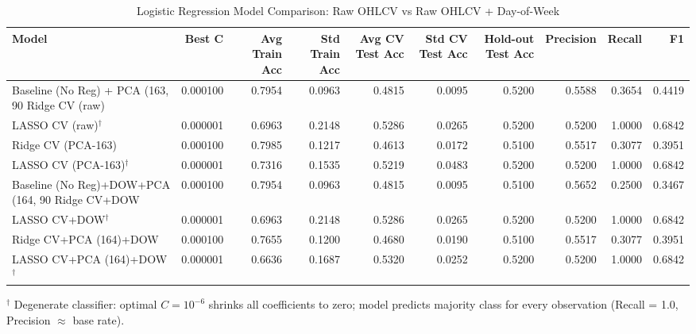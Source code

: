 \begin{table}[htbp]
\centering
\caption{Logistic Regression Model Comparison: Raw OHLCV vs Raw OHLCV + Day-of-Week}
\label{tab:base_logistic_comparison}
\begin{tabular}{lrrrrrrrrr}
\toprule
Model & Best C & Avg Train Acc & Std Train Acc & Avg CV Test Acc & Std CV Test Acc & Hold-out Test Acc & Precision & Recall & F1 \\
\midrule
Baseline (No Reg) + PCA (163, 90%
Ridge CV (raw) & 0.000100 & 0.7954 & 0.0963 & 0.4815 & 0.0095 & 0.5200 & 0.5588 & 0.3654 & 0.4419 \\
LASSO CV (raw)$^\dagger$ & 0.000001 & 0.6963 & 0.2148 & 0.5286 & 0.0265 & 0.5200 & 0.5200 & 1.0000 & 0.6842 \\
Ridge CV (PCA-163) & 0.000100 & 0.7985 & 0.1217 & 0.4613 & 0.0172 & 0.5100 & 0.5517 & 0.3077 & 0.3951 \\
LASSO CV (PCA-163)$^\dagger$ & 0.000001 & 0.7316 & 0.1535 & 0.5219 & 0.0483 & 0.5200 & 0.5200 & 1.0000 & 0.6842 \\
\midrule
Baseline (No Reg)+DOW+PCA (164, 90%
Ridge CV+DOW & 0.000100 & 0.7954 & 0.0963 & 0.4815 & 0.0095 & 0.5100 & 0.5652 & 0.2500 & 0.3467 \\
LASSO CV+DOW$^\dagger$ & 0.000001 & 0.6963 & 0.2148 & 0.5286 & 0.0265 & 0.5200 & 0.5200 & 1.0000 & 0.6842 \\
Ridge CV+PCA (164)+DOW & 0.000100 & 0.7655 & 0.1200 & 0.4680 & 0.0190 & 0.5100 & 0.5517 & 0.3077 & 0.3951 \\
LASSO CV+PCA (164)+DOW$^\dagger$ & 0.000001 & 0.6636 & 0.1687 & 0.5320 & 0.0252 & 0.5200 & 0.5200 & 1.0000 & 0.6842 \\
\bottomrule
\end{tabular}
\par\smallskip
\footnotesize $^\dagger$ Degenerate classifier: optimal $C = 10^{-6}$ shrinks all coefficients to zero; model predicts majority class for every observation (Recall = 1.0, Precision $\approx$ base rate).
\end{table}
